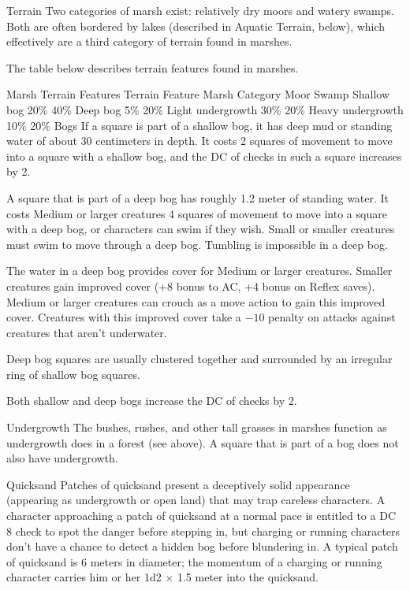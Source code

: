 \Marsh Terrain
Two categories of marsh exist: relatively dry moors and watery swamps. Both are often bordered by lakes (described in Aquatic Terrain, below), which effectively are a third category of terrain found in marshes.

The table below describes terrain features found in marshes.

Marsh Terrain Features
Terrain Feature	Marsh Category
Moor	Swamp
Shallow bog	20\%	40\%
Deep bog	5\%	20\%
Light undergrowth	30\%	20\%
Heavy undergrowth	10\%	20\%
Bogs
If a square is part of a shallow bog, it has deep mud or standing water of about 30 centimeters in depth. It costs 2 squares of movement to move into a square with a shallow bog, and the DC of  checks in such a square increases by 2.

A square that is part of a deep bog has roughly 1.2 meter of standing water. It costs Medium or larger creatures 4 squares of movement to move into a square with a deep bog, or characters can swim if they wish. Small or smaller creatures must swim to move through a deep bog. Tumbling is impossible in a deep bog.

The water in a deep bog provides cover for Medium or larger creatures. Smaller creatures gain improved cover (+8 bonus to AC, +4 bonus on Reflex saves). Medium or larger creatures can crouch as a move action to gain this improved cover. Creatures with this improved cover take a $-10$ penalty on attacks against creatures that aren’t underwater.

Deep bog squares are usually clustered together and surrounded by an irregular ring of shallow bog squares.

Both shallow and deep bogs increase the DC of  checks by 2.

Undergrowth
The bushes, rushes, and other tall grasses in marshes function as undergrowth does in a forest (see above). A square that is part of a bog does not also have undergrowth.

Quicksand
Patches of quicksand present a deceptively solid appearance (appearing as undergrowth or open land) that may trap careless characters. A character approaching a patch of quicksand at a normal pace is entitled to a DC 8  check to spot the danger before stepping in, but charging or running characters don’t have a chance to detect a hidden bog before blundering in. A typical patch of quicksand is 6 meters in diameter; the momentum of a charging or running character carries him or her 1d2 $\times$ 1.5 meter into the quicksand.


